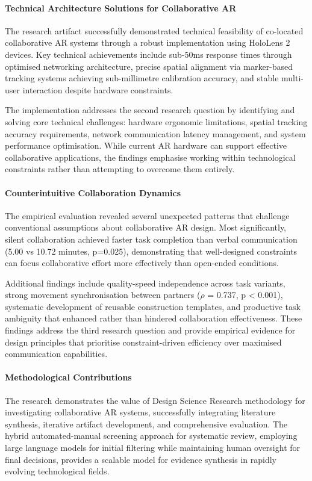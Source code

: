 \paragraph{Technical Architecture Solutions for Collaborative AR}
The research artifact successfully demonstrated technical feasibility of co-located collaborative AR systems through a robust implementation using HoloLens 2 devices. Key technical achievements include sub-50ms response times through optimised networking architecture, precise spatial alignment via marker-based tracking systems achieving sub-millimetre calibration accuracy, and stable multi-user interaction despite hardware constraints.

The implementation addresses the second research question by identifying and solving core technical challenges: hardware ergonomic limitations, spatial tracking accuracy requirements, network communication latency management, and system performance optimisation. While current AR hardware can support effective collaborative applications, the findings emphasise working within technological constraints rather than attempting to overcome them entirely.

\paragraph{Counterintuitive Collaboration Dynamics}
The empirical evaluation revealed several unexpected patterns that challenge conventional assumptions about collaborative AR design. Most significantly, silent collaboration achieved faster task completion than verbal communication (5.00 vs 10.72 minutes, p=0.025), demonstrating that well-designed constraints can focus collaborative effort more effectively than open-ended conditions.

Additional findings include quality-speed independence across task variants, strong movement synchronisation between partners ($\rho$ = 0.737, p < 0.001), systematic development of reusable construction templates, and productive task ambiguity that enhanced rather than hindered collaboration effectiveness. These findings address the third research question and provide empirical evidence for design principles that prioritise constraint-driven efficiency over maximised communication capabilities.

\paragraph{Methodological Contributions}
The research demonstrates the value of Design Science Research methodology for investigating collaborative AR systems, successfully integrating literature synthesis, iterative artifact development, and comprehensive evaluation. The hybrid automated-manual screening approach for systematic review, employing large language models for initial filtering while maintaining human oversight for final decisions, provides a scalable model for evidence synthesis in rapidly evolving technological fields.

